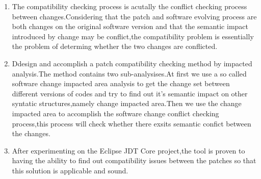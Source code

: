 \begin{eabstract}
		\begin{enumerate}
			\item The compatibility checking process is acutally the conflict checking process between changes.Considering that the patch and software evolving process are both changes on the original software version and that the semantic impact introduced by change may be conflict,the compatibility problem is essentially the problem of determing whether the two changes are conflicted.
			\item Ddesign and accomplish a patch compatibility checking method by impacted analysis.The method contains two sub-analysises.At first we use a so called software change impacted area analysis to get the change set between different versions of codes and try to find out it's semantic impact on other syntatic structures,namely change impacted area.Then we use the change impacted area to accomplish the software change conflict checking process,this process will check whether there exsits semantic confict between the changes.
			\item After experimenting on the Eclipse JDT Core project,the tool is proven to having the ability to find out compatibility issues between the patches so that this solution is applicable and sound.
		\end{enumerate}
		
%		
%		
		
		

\end{eabstract}
